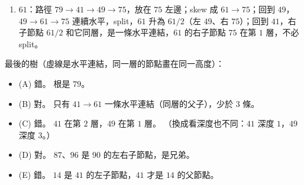 \begin{pastsoln}
\begin{enumerate}
$90/2$（左 $87$、右 $96$）；回到 $79$，右子節點 $90/2$ 和它同層，是水平連結；回到 $41$，$41 \to 79 \to 90$ 三個都在第 $2$ 層，
split，$79$ 升為 $79/3$ 成為根，左 $41/2$、右 $90/2$。
\item $61$：路徑 $79 \to 41 \to 49 \to 75$，放在 $75$ 左邊；skew 成 $61 \to 75$；回到 $49$，$49 \to 61 \to 75$ 連續水平，split，$61$ 升為
$61/2$（左 $49$、右 $75$）；回到 $41$，右子節點 $61/2$ 和它同層，是一條水平連結，$61$ 的右子節點 $75$ 在第 $1$ 層，不必 split。
\end{enumerate}
最後的樹（虛線是水平連結，同一層的節點畫在同一高度）：
\begin{center}
\end{center}
\begin{itemize}
\item (A) 錯。 根是 $79$。
\item (B) 對。 只有 $41 \to 61$ 一條水平連結（同層的父子），少於 $3$ 條。
\item (C) 錯。 $41$ 在第 $2$ 層，$49$ 在第 $1$ 層。 （換成看深度也不同：$41$ 深度 $1$，$49$ 深度 $3$。）
\item (D) 對。 $87$、$96$ 是 $90$ 的左右子節點，是兄弟。
\item (E) 錯。 $14$ 是 $41$ 的左子節點，$41$ 才是 $14$ 的父節點。
\end{itemize}
\end{pastsoln}
